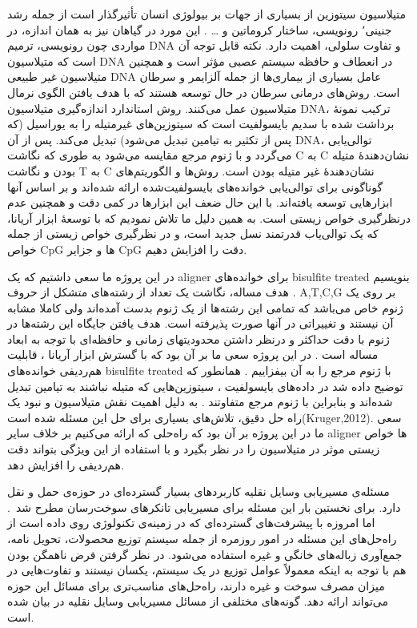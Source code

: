 


متیلاسیون سیتوزین از بسیاری از جهات بر بیولوژی انسان تأثیرگذار است از جمله رشد جنینی٬ رونویسی، ساختار کروماتین و … . این مورد در گیاهان نیز به همان اندازه، در مواردی چون رونویسی، ترمیم DNA و تفاوت سلولی، اهمیت دارد. نکته قابل توجه آن است که متیلاسیون DNA در انعطاف و حافظه سیستم عصبی مؤثر است و همچنین متیلاسیون غیر طبیعی DNA عامل بسیاری از بیماری‌ها از جمله آلزایمر و سرطان است. روش‌های درمانی سرطان در حال توسعه هستند که با هدف یافتن الگوی نرمال متیلاسیون عمل می‌کنند.
روش استاندارد اندازه‌گیری متیلاسیون DNA، ترکیب نمونهٔ برداشت شده با سدیم بایسولفیت است که سیتوزین‌های غیرمتیله را به یوراسیل (که پس از تکثیر به تیامین تبدیل می‌شود) تبدیل می‌کند. پس از آن DNA، توالی‌یابی می‌گردد و با ژنوم مرجع مقایسه می‌شود به طوری که نگاشت C به C نشان‌دهندهٔ متیله بودن و نگاشت T به C نشان‌دهندهٔ غیر متیله بودن است.
روش‌ها و الگوریتم‌های گوناگونی برای توالی‌یابی خوانده‌های بایسولفیت‌شده ارائه شده‌اند و بر اساس آنها ابزارهایی توسعه یافته‌اند. با این حال ضعف این ابزارها در کمی دقت و همچنین عدم درنظرگیری خواص زیستی است. به همین دلیل ما تلاش نمودیم که با توسعهٔ ابزار آریانا، که یک توالی‌یاب قدرتمند نسل جدید است، و در نظرگیری خواص زیستی از جمله خواص CpG ها و جزایر CpG دقت را افزایش دهیم.



در این پروژه ما سعی داشتیم که یک aligner برای خوانده‌های bisulfite treated بنویسیم . هدف مساله، نگاشت یک تعداد از رشته‌های متشکل از حروف A,T,C,G  بر روی یک ژنوم خاص می‌باشد که تمامی این رشته‌ها از یک ژنوم بدست آمده‌اند ولی کاملا مشابه آن نیستند و تغییراتی در آنها صورت پذیرفته است. هدف یافتن جایگاه این رشته‌ها در ژنوم با دقت حداکثر و درنظر داشتن محدودیتهای زمانی و حافظه‌ای با توجه به ابعاد مساله است .
در این پروژه سعی ما بر آن بود که با گسترش ابزار آریانا ، قابلیت هم‌ردیفی خوانده‌های bisulfite treated با ژنوم مرجع را به آن بیفزاییم . همانطور که توضیح داده شد در داده‌های بایسولفیت ، سیتوزین‌هایی که متیله نباشند به تیامین تبدیل شده‌اند و بنابراین با ژنوم مرجع متفاوتند . به دلیل اهمیت نقش متیلاسیون و نبود یک راه حل دقیق، تلاش‌های بسیاری برای حل این مسئله شده است(Kruger,2012). 
سعی ما در این پروژه بر آن بود که راه‌حلی که ارائه می‌کنیم بر خلاف سایر aligner ها خواص زیستی موثر در متیلاسیون را در نظر بگیرد و با استفاده از این ویژگی بتواند دقت هم‌ردیفی را افزایش دهد.


مسئله‌ی مسیریابی وسایل نقلیه کاربردهای بسیار گسترده‌ای در حوزه‌ی حمل و نقل دارد. برای نخستین بار این مسئله برای مسیریابی تانکرهای سوخت‌رسان مطرح شد~\cite{Dantzig}. اما امروزه با پیشرفت‌های گسترده‌ای که در زمینه‌ی تکنولوژی روی داده است از راه‌حل‌های این مسئله در امور روزمره از جمله سیستم توزیع محصولات، تحویل نامه، جمع‌آوری زباله‌های خانگی و غیره استفاده می‌شود. در نظر گرفتن فرض ناهمگن بودن هم با توجه به اینکه معمولاً عوامل توزیع در یک سیستم، یکسان نیستند و تفاوت‌هایی در میزان مصرف سوخت و غیره دارند، راه‌حل‌های مناسب‌تری برای مسائل این حوزه می‌تواند ارائه دهد.
گونه‌های مختلفی از مسائل مسیریابی وسایل نقلیه در 
بیان شده است.


